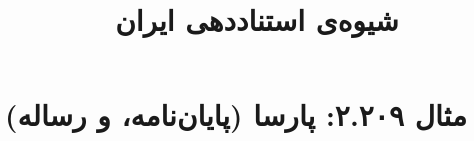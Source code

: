 \documentclass[a4paper,10pt]{article}
\begin{document}
\title{شیوه‌ی استناددهی ایران
 }
\author{}
\date{}
\maketitle



\section*{مثال ۲.۲۰۹: پارسا (پایان‌نامه، و رساله)}

\cite{فلاحی1380}\\
\cite{خاکنژاد1367}\\
\cite{schwarz2000}






\end{document}
